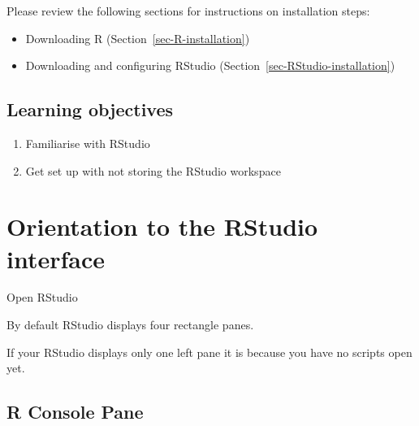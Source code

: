 \documentclass[
  letterpaper,
  DIV=11,
  numbers=noendperiod,
  oneside]{scrreprt}
\providecommand{\tightlist}{%
  \setlength{\itemsep}{0pt}\setlength{\parskip}{0pt}}\usepackage{longtable,booktabs,array}
\begin{document}
Please review the following sections for instructions on installation
steps:

\begin{itemize}
\tightlist
\item
  Downloading R (Section~\ref{sec-R-installation})
\item
  Downloading and configuring RStudio
  (Section~\ref{sec-RStudio-installation})
\end{itemize}

\hypertarget{learning-objectives-3}{%
\subsection{Learning objectives}\label{learning-objectives-3}}

\begin{enumerate}
\def\labelenumi{\arabic{enumi}.}
\tightlist
\item
  Familiarise with RStudio
\item
  Get set up with not storing the RStudio workspace
\end{enumerate}

\hypertarget{orientation-to-the-rstudio-interface}{%
\section{Orientation to the RStudio
interface}\label{orientation-to-the-rstudio-interface}}

Open RStudio

By default RStudio displays four rectangle panes.

\begin{tcolorbox}[enhanced jigsaw, coltitle=black, opacityback=0, title=\textcolor{quarto-callout-tip-color}{\faLightbulb}\hspace{0.5em}{Tip}, toprule=.15mm, bottomtitle=1mm, colbacktitle=quarto-callout-tip-color!10!white, colframe=quarto-callout-tip-color-frame, left=2mm, opacitybacktitle=0.6, bottomrule=.15mm, arc=.35mm, toptitle=1mm, colback=white, titlerule=0mm, breakable, leftrule=.75mm, rightrule=.15mm]

If your RStudio displays only one left pane it is because you have no
scripts open yet.

\end{tcolorbox}

\subsection{R Console Pane}
\end{document}
